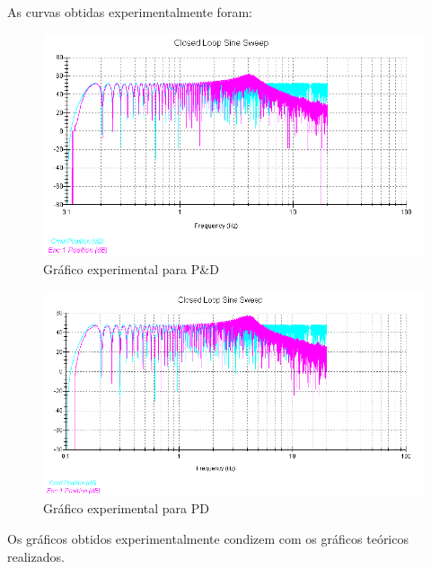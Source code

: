 \documentclass[a4paper,11pt]{article}
\begin{document}
As curvas obtidas experimentalmente foram:

\begin{figure}[H]
\includegraphics[scale=0.85]{q12-bode}
\caption{Gráfico experimental para P\&D}
\centering
\end{figure}

\begin{figure}[H]
\includegraphics[scale=0.8]{q13-bode}
\caption{Gráfico experimental para PD}
\centering
\end{figure}

Os gráficos obtidos experimentalmente condizem com os gráficos teóricos
realizados.
\end{document}
